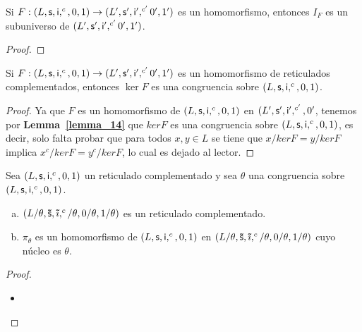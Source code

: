   \begin{lemma} \label{lemma_17}
    \PN Si $F: (L, \mathsf{s}, \mathsf{i}, ^{c}, 0, 1) \rightarrow (L^{\prime}, \mathsf{s}^{\prime}, \mathsf{i}^{\prime}, ^{c^{\prime}} 0^{\prime}, 1^{\prime})$ es un homomorfismo, entonces $I_{F}$ es un subuniverso de
    $(L^{\prime}, \mathsf{s}^{\prime}, \mathsf{i}^{\prime}, ^{c^{\prime}} 0^{\prime}, 1^{\prime})$.
  \end{lemma}
  \begin{proof}
  \end{proof}

  \begin{lemma} \label{lemma_18}
    \PN Si $F: (L, \mathsf{s}, \mathsf{i}, ^{c}, 0, 1) \rightarrow (L^{\prime}, \mathsf{s}^{\prime}, \mathsf{i}^{\prime}, ^{c^{\prime}} 0^{\prime}, 1^{\prime})$ es un homomorfismo de reticulados complementados,
    entonces $\ker F$ es una congruencia sobre $(L, \mathsf{s}, \mathsf{i}, ^{c}, 0, 1)$.
  \end{lemma}
  \begin{proof}
    \PN Ya que $F$ es un homomorfismo de $(L, \mathsf{s}, \mathsf{i}, ^{c}, 0, 1)$ en $(L^{\prime}, \mathsf{s}^{\prime}, \mathsf{i}^{\prime},
    ^{c^{\prime}}, 0^{\prime}$, tenemos por \textbf{Lemma~\ref{lemma_14}} que $ker F$ es una congruencia sobre $(L, \mathsf{s},
    \mathsf{i}, ^{c}, 0, 1)$, es decir, solo falta probar que para todos $x, y \in L$ se tiene que $x / ker F = y / ker F$
    implica $x^{c} / ker F = y^{c} / ker F$, lo cual es dejado al lector.
  \end{proof}

  \begin{lemma} \label{lemma_19}
    \PN Sea $(L, \mathsf{s}, \mathsf{i}, ^{c}, 0, 1)$ un reticulado complementado y sea $\theta$ una congruencia sobre $(L, \mathsf{s}, \mathsf{i}, ^{c}, 0, 1)$.
    \begin{enumerate}[a)]
      \item $(L/\theta, \mathsf{\tilde{s}}, \mathsf{\tilde{\imath}}, ^{c}/\theta, 0/\theta, 1/\theta)$ es un reticulado complementado.
      \item $\pi_{\theta}$ es un homomorfismo de $(L, \mathsf{s}, \mathsf{i}, ^{c}, 0, 1)$ en $(L/\theta, \mathsf{\tilde{s}}, \mathsf{\tilde{\imath}}, ^{c}/\theta, 0/\theta, 1/\theta)$ cuyo núcleo es $\theta$.
    \end{enumerate}
  \end{lemma}
  \begin{proof}
    \begin{itemize}[a)]
      \item
    \end{itemize}
  \end{proof}

